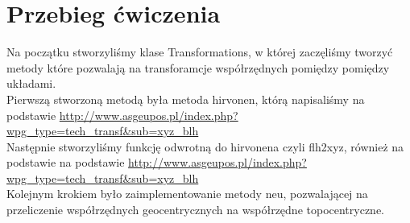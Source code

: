 \documentclass[12pt, a4paper]{article}
\begin{document}
\section{Przebieg ćwiczenia}
Na początku stworzyliśmy klase Transformations, w której zaczęliśmy tworzyć metody które pozwalają na transforamcje współrzędnych pomiędzy pomiędzy układami.\\
Pierwszą stworzoną metodą była metoda hirvonen, którą napisaliśmy na podstawie 
\url{http://www.asgeupos.pl/index.php?wpg_type=tech_transf&sub=xyz_blh}\\
Następnie stworzyliśmy funkcję odwrotną do hirvonena czyli flh2xyz, również na podstawie na podstawie 
\url{http://www.asgeupos.pl/index.php?wpg_type=tech_transf&sub=xyz_blh}\\
Kolejnym krokiem było zaimplementowanie metody neu, pozwalającej na przeliczenie współrzędnych geocentrycznych na współrzędne topocentryczne.
\end{document}
